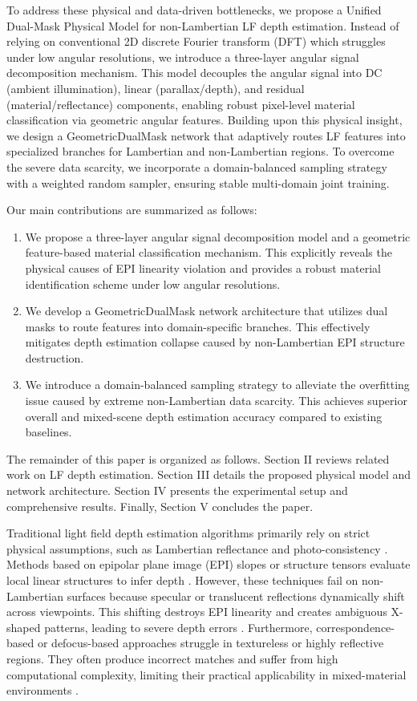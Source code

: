 \documentclass[lettersize,journal]{IEEEtran}
\begin{document}
To address these physical and data-driven bottlenecks, we propose a Unified Dual-Mask Physical Model for non-Lambertian LF depth estimation. Instead of relying on conventional 2D discrete Fourier transform (DFT) which struggles under low angular resolutions, we introduce a three-layer angular signal decomposition mechanism. This model decouples the angular signal into DC (ambient illumination), linear (parallax/depth), and residual (material/reflectance) components, enabling robust pixel-level material classification via geometric angular features. Building upon this physical insight, we design a GeometricDualMask network that adaptively routes LF features into specialized branches for Lambertian and non-Lambertian regions. To overcome the severe data scarcity, we incorporate a domain-balanced sampling strategy with a weighted random sampler, ensuring stable multi-domain joint training.

Our main contributions are summarized as follows:
\begin{enumerate}
\item We propose a three-layer angular signal decomposition model and a geometric feature-based material classification mechanism. This explicitly reveals the physical causes of EPI linearity violation and provides a robust material identification scheme under low angular resolutions.
\item We develop a GeometricDualMask network architecture that utilizes dual masks to route features into domain-specific branches. This effectively mitigates depth estimation collapse caused by non-Lambertian EPI structure destruction.
\item We introduce a domain-balanced sampling strategy to alleviate the overfitting issue caused by extreme non-Lambertian data scarcity. This achieves superior overall and mixed-scene depth estimation accuracy compared to existing baselines.
\end{enumerate}

The remainder of this paper is organized as follows. Section II reviews related work on LF depth estimation. Section III details the proposed physical model and network architecture. Section IV presents the experimental setup and comprehensive results. Finally, Section V concludes the paper.

Traditional light field depth estimation algorithms primarily rely on strict physical assumptions, such as Lambertian reflectance and photo-consistency \cite{visionappl}. Methods based on epipolar plane image (EPI) slopes or structure tensors evaluate local linear structures to infer depth \cite{epislop}. However, these techniques fail on non-Lambertian surfaces because specular or translucent reflections dynamically shift across viewpoints. This shifting destroys EPI linearity and creates ambiguous X-shaped patterns, leading to severe depth errors \cite{epistru_7}. Furthermore, correspondence-based or defocus-based approaches struggle in textureless or highly reflective regions. They often produce incorrect matches and suffer from high computational complexity, limiting their practical applicability in mixed-material environments \cite{defoculimi}.
\end{document}
